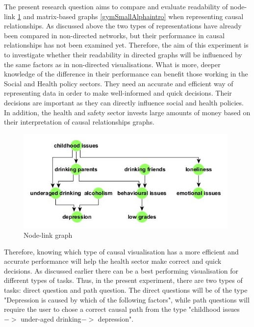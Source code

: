 \documentclass{l4proj}
\begin{document}
The present research question aims to compare and evaluate readability of node-link \ref{drinkingIssuesSmallHierIntro} and matrix-based graphs \ref{gymSmallAlphaintro} when representing causal relationships. As discussed above the two types of representations have already been compared in non-directed networks, but their performance in causal relationships has not been examined yet. Therefore, the aim of this experiment is to investigate whether their readability in directed graphs will be influenced by the same factors as in non-directed visualisations. What is more, deeper knowledge of the difference in their performance can benefit those working in the Social and Health policy sectors. They need an accurate and efficient way of representing data in order to make well-informed and quick decisions. Their decisions are important as they can directly influence social and health policies. In addition, the health and safety sector invests large amounts of money based on their interpretation of causal relationships graphs.


\begin{figure}[H]
\centering
\includegraphics[width=11cm]{images/drinkingIssuesSmallHier.jpg}
\caption{Node-link graph}
\label{drinkingIssuesSmallHierIntro}
\end{figure}

Therefore, knowing which type of causal visualisation has a more efficient and accurate performance will help the health sector make correct and quick decisions. As discussed earlier there can be a best performing visualisation for different types of tasks. Thus, in the present experiment, there are two types of tasks: direct question and path question. The direct questions will be of the type "Depression is caused by which of the following factors", while path questions will require the user to chose a correct causal path from the type "childhood issues $->$ under-aged drinking$->$ depression". 
\end{document}
